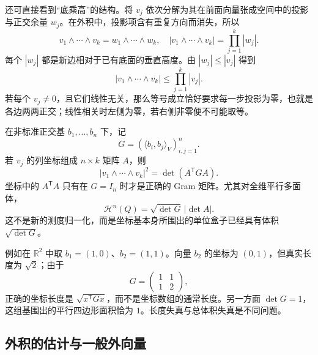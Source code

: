 \ProseParagraphBreak

还可直接看到“底乘高”的结构。将 \(v_j\) 依次分解为其在前面向量张成空间中的投影与正交余量 \(w_j\)。在外积中，投影项含有重复方向而消失，所以
\[
 v_1\wedge\cdots\wedge v_k=w_1\wedge\cdots\wedge w_k,
 \quad
 |v_1\wedge\cdots\wedge v_k|=\prod_{j=1}^k|w_j|.
\]
每个 \(|w_j|\) 都是新边相对于已有底面的垂直高度。由 \(|w_j|\leq|v_j|\) 得到
\[
 |v_1\wedge\cdots\wedge v_k|\leq\prod_{j=1}^k|v_j|.
\]
若每个 \(v_j\ne0\)，且它们线性无关，那么等号成立恰好要求每一步投影为零，也就是各边两两正交；线性相关时左侧为零，若右侧非零便不可能取等。

\ProseParagraphBreak

在非标准正交基 \(b_1,\ldots,b_n\) 下，记
\[
 G=(\langle b_i,b_j\rangle_V)_{i,j=1}^n.
\]
若 \(v_j\) 的列坐标组成 \(n\times k\) 矩阵 \(A\)，则
\[
 |v_1\wedge\cdots\wedge v_k|^2=\det(A^{\mathsf T}GA).
\]
坐标中的 \(A^{\mathsf T}A\) 只有在 \(G=I_n\) 时才是正确的 Gram 矩阵。尤其对全维平行多面体，
\[
 \mathcal H^n(Q)=\sqrt{\det G}\,|\det A|.
\]
这不是新的测度归一化，而是坐标基本身所围出的单位盒子已经具有体积 \(\sqrt{\det G}\)。

\ProseParagraphBreak

例如在 \(\mathbb R^2\) 中取 \(b_1=(1,0)\)、\(b_2=(1,1)\)。向量 \(b_2\) 的坐标为 \((0,1)\)，但真实长度为 \(\sqrt2\)；由于
\[
 G=\begin{pmatrix}1&1\\1&2\end{pmatrix},
\]
正确的坐标长度是 \(\sqrt{x^{\mathsf T}Gx}\)，而不是坐标数组的通常长度。另一方面 \(\det G=1\)，这组基围出的平行四边形面积恰为 \(1\)。长度失真与总体积失真是不同问题。

\subsection{外积的估计与一般外向量}
\label{b1:subsec:B10303}


